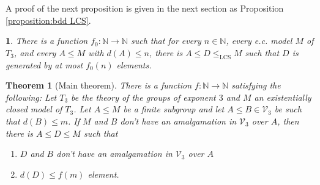 \documentclass[11pt,reqno]{article}
\newtheorem{theorem}{Theorem}[section]
\newcommand{\custompropositiontitle}{}
\newtheorem*{custompropositioninner}{\custompropositiontitle}
\newenvironment{customproposition}[1]
  {\renewcommand{\custompropositiontitle}{Proposition #1}%
   \begin{custompropositioninner}}
  {\end{custompropositioninner}}
\theoremstyle{definition}
\theoremstyle{remark}
\newcommand{\LCS}{\mathrm{LCS}}
\begin{document}
A proof of the next proposition is given in the next section as Proposition \ref{proposition:bdd LCS}.
\begin{customproposition}{A}
    There is a function $f_0:\mathbb N\to\mathbb N$ such that for every $n\in\mathbb N$, every e.c. model $M$ of $T_3$, and every $A\leq M$ with $d(A)\leq n$, there is $A\leq D\leq_{\LCS}M$ such that $D$ is generated by at most $f_0(n)$ elements.
\end{customproposition}


\begin{theorem}[Main theorem]
\label{thm:main}
There is a function $f:\mathbb N\to \mathbb N$ satisfying the following:
Let $T_3$ be the theory of the groups of exponent $3$ and $M$ an existentially closed model of $T_3$.
Let $A\leq M$ be a finite subgroup and let $A\leq B\in\mathcal V_3$ be such that $d(B)\leq m$.
If $M$ and $B$ don't have an amalgamation in $\mathcal V_3$ over $A$, then there is $A\leq D\leq M$ such that 
\begin{enumerate}
    \item $D$ and $B$ don't have an amalgamation in $\mathcal V_3$ over $A$
    \item $d(D)\leq f(m)$ element.
\end{enumerate}
\end{theorem}
\end{document}
